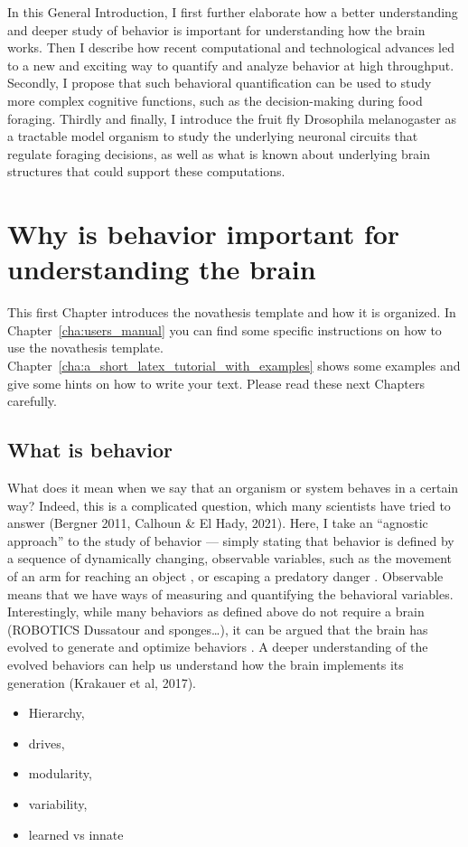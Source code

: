 In this General Introduction, I first further elaborate how a better understanding and deeper study of behavior is important for understanding how the brain works. Then I describe how recent computational and technological advances led to a new and exciting way to quantify and analyze behavior at high throughput. Secondly, I propose that such behavioral quantification can be used to study more complex cognitive functions, such as the decision-making during food foraging. Thirdly and finally, I introduce the fruit fly Drosophila melanogaster as a tractable model organism to study the underlying neuronal circuits that regulate foraging decisions, as well as what is known about underlying brain structures that could support these computations.


\section{Why is behavior important for understanding the brain}
\label{sec:whybehavior}

This first Chapter introduces the \gls{novathesis} template and how it is organized. In Chapter~\ref{cha:users_manual} you can find some specific instructions on how to use the \gls{novathesis} template.  Chapter~\ref{cha:a_short_latex_tutorial_with_examples} shows some examples and give some hints on how to write your text. Please read these next Chapters carefully.

\subsection{What is behavior}
\label{sub:whatbehavior}

What does it mean when we say that an organism or system behaves in a certain way? Indeed, this is a complicated question, which many scientists have tried to answer \needscite(Bergner 2011, Calhoun \& El Hady, 2021). Here, I take an “agnostic approach” to the study of behavior — simply stating that behavior is defined by a sequence of dynamically changing, observable variables, such as the movement of an arm for reaching an object \needscite, or escaping a predatory danger \needscite. Observable means that we have ways of measuring and quantifying the behavioral variables. Interestingly, while many behaviors as defined above do not require a brain \needscite(ROBOTICS Dussatour and sponges…), it can be argued that the brain has evolved to generate and optimize behaviors \needscite. A deeper understanding of the evolved behaviors can help us understand how the brain implements its generation \needscite(Krakauer et al, 2017).
\begin{itemize}
\item Hierarchy,
\item drives,
\item modularity,
\item variability,
\item learned vs innate
\end{itemize}

